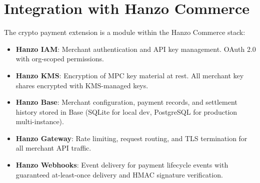 \section{Integration with Hanzo Commerce}

\label{sec:integration}

The crypto payment extension is a module within the Hanzo Commerce stack:

\begin{itemize}[leftmargin=1.4em]
    \item \textbf{Hanzo IAM}: Merchant authentication and API key
    management. OAuth 2.0 with org-scoped permissions.
    \item \textbf{Hanzo KMS}: Encryption of MPC key material at rest.
    All merchant key shares encrypted with KMS-managed keys.
    \item \textbf{Hanzo Base}: Merchant configuration, payment records,
    and settlement history stored in Base (SQLite for local dev,
    PostgreSQL for production multi-instance).
    \item \textbf{Hanzo Gateway}: Rate limiting, request routing, and
    TLS termination for all merchant API traffic.
    \item \textbf{Hanzo Webhooks}: Event delivery for payment lifecycle
    events with guaranteed at-least-once delivery and HMAC signature
    verification.
\end{itemize}

